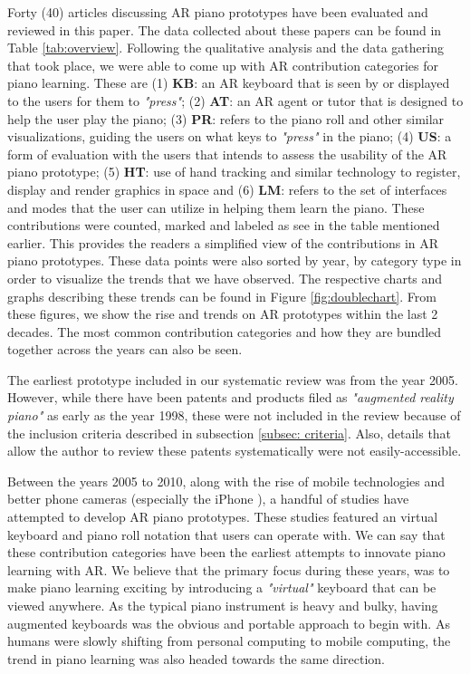 \documentclass[sigchi, review]{acmart}
\begin{document}
\label{sec: trends}
Forty (40) articles discussing AR piano prototypes have been evaluated and reviewed in this paper. The data collected about these papers can be found in Table \ref{tab:overview}. Following the qualitative analysis and the data gathering that took place, we were able to come up with AR contribution categories for piano learning. These are (1) \textbf{KB}: an AR keyboard that is seen by or displayed to the users for them to \textit{"press"}; (2) \textbf{AT}: an AR agent or tutor that is designed to help the user play the piano; (3) \textbf{PR}: refers to the piano roll and other similar visualizations, guiding the users on what keys to  \textit{"press"} in the piano; (4) \textbf{US}: a form of evaluation with the users that intends to assess the usability of the AR piano prototype; (5) \textbf{HT}: use of hand tracking and similar technology to register, display and render graphics in space and (6) \textbf{LM}: refers to the set of interfaces and modes that the user can utilize in helping them learn the piano. These contributions were counted, marked and labeled as see in the table mentioned earlier. This provides the readers a simplified view of the contributions in AR piano prototypes. These data points were also sorted by year, by category type in order to visualize the trends that we have observed. The respective charts and graphs describing these trends can be found in Figure \ref{fig:doublechart}. From these figures, we show the rise and trends on AR prototypes within the last 2 decades. The most common contribution categories and how they are bundled together across the years can also be seen. 

The earliest prototype included in our systematic review was from the year 2005. However, while there have been patents and products filed as \textit{"augmented reality piano"} as early as the year 1998, these were not included in the review because of the inclusion criteria described in subsection \ref{subsec: criteria}. Also, details that allow the author to review these patents systematically were not easily-accessible.

Between the years 2005 to 2010, along with the rise of mobile technologies and better phone cameras (especially the iPhone \cite{querashi2012apple}), a handful of studies have attempted to develop AR piano prototypes. These studies featured an virtual keyboard and piano roll notation that users can operate with. We can say that these contribution categories have been the earliest attempts to innovate piano learning with AR. We believe that the primary focus during these years, was to make piano learning exciting by introducing a \textit{"virtual"} keyboard that can be viewed anywhere. As the typical piano instrument is heavy and bulky, having augmented keyboards was the obvious and portable approach to begin with. As humans were slowly shifting from personal computing to mobile computing, the trend in piano learning was also headed towards the same direction.
\end{document}

